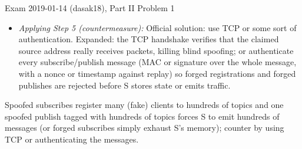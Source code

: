 \documentclass[12pt, a4paper]{article}
\begin{document}
\begin{practicebox}{Exam 2019-01-14 (dasak18), Part II Problem 1}
\begin{itemize}
    This forces the server to send hundreds of notification messages to many clients --- the attacker's handful of packets have multiplied into a flood of server work and traffic, so the attacker's inferior bandwidth is irrelevant (the server supplies both the bandwidth and the state).
    \emph{Alternatively}, the attacker simply exhausts all of the server's memory by continuing to subscribe (forged) users indefinitely.
    \item \textit{Applying Step 5 (countermeasure):} Official solution: use TCP or some sort of authentication. Expanded: the TCP handshake verifies that the claimed source address really receives packets, killing blind spoofing; or authenticate every subscribe/publish message (MAC or signature over the whole message, with a nonce or timestamp against replay) so forged registrations and forged publishes are rejected before S stores state or emits traffic.
\end{itemize}

\begin{answerbox}
Spoofed subscribes register many (fake) clients to hundreds of topics and one spoofed publish tagged with hundreds of topics forces S to emit hundreds of messages (or forged subscribes simply exhaust S's memory); counter by using TCP or authenticating the messages.
\end{answerbox}
\end{practicebox}
\end{document}
